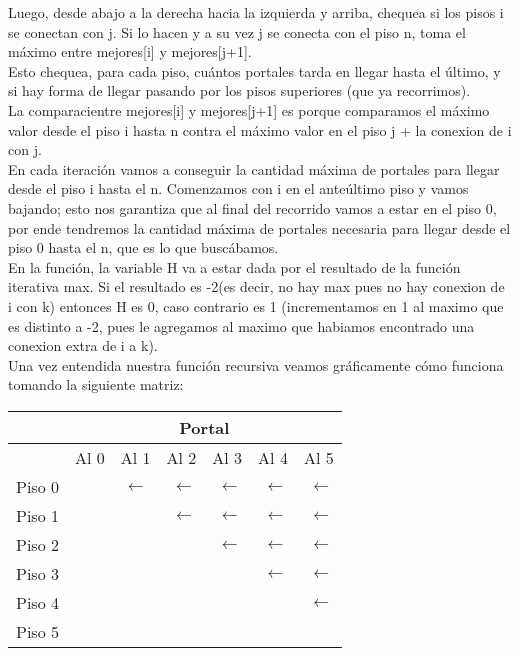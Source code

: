 Luego, desde abajo a la derecha hacia la izquierda y arriba, chequea si los pisos i se conectan con j. Si lo hacen y a su vez j se conecta con el piso n, toma el m\'aximo entre  mejores[i] y mejores[j+1].\\

Esto chequea, para cada piso, cu\'antos portales tarda en llegar hasta el \'ultimo, y si hay forma de llegar pasando por los pisos superiores (que ya recorrimos).\\ 
La comparaci\on entre mejores[i] y mejores[j+1] es porque comparamos el m\'aximo valor desde el piso i hasta n contra el m\'aximo valor en el piso j + la conexion de i con j.\\

En cada iteraci\'on vamos a conseguir la cantidad m\'axima de portales para llegar desde el piso i hasta el n. Comenzamos con i en el ante\'ultimo piso y vamos bajando; esto nos garantiza que al final del recorrido vamos a estar en el piso 0, por ende tendremos la cantidad m\'axima de portales necesaria para llegar desde el piso 0 hasta el n, que es lo que busc\'abamos.\\

En la funci\'on, la variable H va a estar dada por el resultado de la funci\'on iterativa max. Si el resultado es -2(es decir, no hay max pues no hay conexion de i con k) entonces H es 0, caso contrario es 1 (incrementamos en 1 al maximo que es distinto a -2, pues le agregamos al maximo que habiamos encontrado una conexion extra de i a k).\\

Una vez entendida nuestra funci\'on recursiva veamos gr\'aficamente c\'omo funciona tomando la siguiente matriz: 
\pagebreak

\begin{center}
  \begin{tabular}{| l | l | c | r | r | r | r |}
    \hline
   & \multicolumn{6}{|c|}{Portal} \\ \hline
    & Al 0 & Al 1 & Al 2 & Al 3 & Al 4 & Al 5 \\ \hline
    
    Piso 0 &\cellcolor{red} & $\leftarrow$ & $\leftarrow$  & $\leftarrow$ & $\leftarrow$  & $\leftarrow$ \\ \hline
    Piso 1 &\cellcolor{red} & \cellcolor{red} & $\leftarrow$  & $\leftarrow$ & $\leftarrow$  & $\leftarrow$ \\ \hline
    Piso 2 &\cellcolor{red} & \cellcolor{red} & \cellcolor{red} & $\leftarrow$ & $\leftarrow$  & $\leftarrow$ \\ \hline
    Piso 3 &   \cellcolor{red} & \cellcolor{red} & \cellcolor{red} & \cellcolor{red} & $\leftarrow$ & $\leftarrow$  \\ \hline
    Piso 4 &   \cellcolor{red} & \cellcolor{red} & \cellcolor{red} & \cellcolor{red} & \cellcolor{red} & $\leftarrow$  \\ \hline
    Piso 5 &\cellcolor{red} & \cellcolor{red} & \cellcolor{red} & \cellcolor{red} &\cellcolor{red}  &\cellcolor{red}  \\ \hline
    
  \end{tabular}
\end{center}


